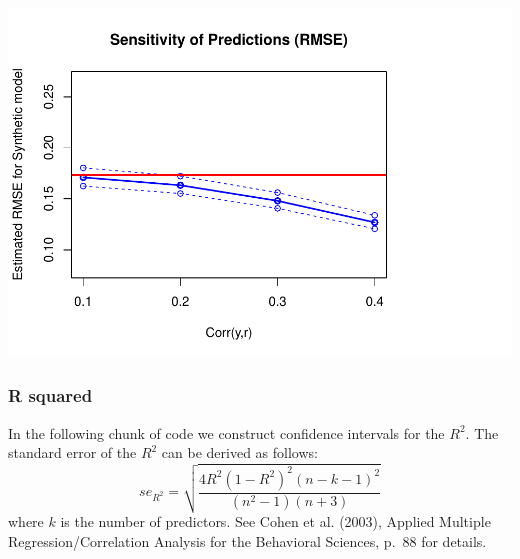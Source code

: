 \documentclass[]{article}
\newenvironment{Shaded}{\begin{snugshade}}{\end{snugshade}}
\newcommand{\DataTypeTok}[1]{\textcolor[rgb]{0.13,0.29,0.53}{#1}}
\newcommand{\DecValTok}[1]{\textcolor[rgb]{0.00,0.00,0.81}{#1}}
\newcommand{\FloatTok}[1]{\textcolor[rgb]{0.00,0.00,0.81}{#1}}
\newcommand{\KeywordTok}[1]{\textcolor[rgb]{0.13,0.29,0.53}{\textbf{#1}}}
\newcommand{\NormalTok}[1]{#1}
\newcommand{\OperatorTok}[1]{\textcolor[rgb]{0.81,0.36,0.00}{\textbf{#1}}}
\newcommand{\StringTok}[1]{\textcolor[rgb]{0.31,0.60,0.02}{#1}}
\begin{document}
\begin{Shaded}
\end{Shaded}

\includegraphics{sensitivity_analysis_files/figure-latex/unnamed-chunk-8-1.pdf}

\hypertarget{r-squared}{%
\subsubsection{R squared}\label{r-squared}}

In the following chunk of code we construct confidence intervals for the
\(R^2\). The standard error of the \(R^2\) can be derived as follows:
\begin{equation}
se_{R^2}=\sqrt{\frac{4R^2(1-R^2)^2(n-k-1)^2}{(n^2-1)(n+3)}} 
\end{equation} where \(k\) is the number of predictors. See Cohen et al.
(2003), Applied Multiple Regression/Correlation Analysis for the
Behavioral Sciences, p.~88 for details.
\end{document}
